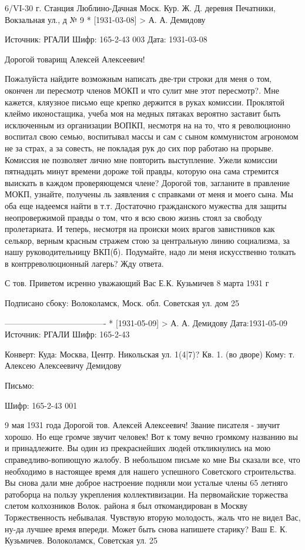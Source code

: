 \documentclass[]{memoir}
\begin{document}
6/VI-30 г.
Станция Люблино-Дачная Моск. Кур. Ж. Д. 
деревня Печатники, Вокзальная ул., д № 9
* [1931-03-08] > А. А. Демидову 

Источник: РГАЛИ
Шифр: 165-2-43 003
Дата: 1931-03-08

Дорогой товарищ
Алексей Алексеевич!

Пожалуйста найдите возможным написать две-три строки для меня о том, окончен ли пересмотр членов МОКП и что сулит мне этот пересмотр?.
Мне кажется, кляузное письмо еще крепко держится в руках комиссии. Проклятой клеймо иконостащика, учеба моя на медных пятаках вероятно заставит быть исключенным из организации ВОПКП, несмотря на на то, что я революционно воспитал свою семью, воспитывал массы и сам с сыном коммунистом агрономом не за страх, а за совесть, не покладая рук до сих пор работаю на прорыве.
Комиссия не позволяет лично мне повторить выступление. Ужели комиссии пятнадцать минут времени дороже той правды, которую она сама стремится выискать в каждом проверяющемся члене?
Дорогой тов, загланите в правление МОКП, узнайте, получены ль заявления с справками от меня и моего сына. Мы оба еще надеемся найти в т.т. Достаточно гражданского мужества для защиты неопровержимой правды о том, что я всю свою жизнь стоял за свободу пролетариата.
И теперь, несмотря на происки моих врагов завистников как селькор, верным красным стражем стою за центральную линию социализма, за нашу руководительницу ВКП(б). Подумайте, надо ли меня искусственно толкать в контрреволюционный лагерь? Жду ответа.

 С тов. Приветом исренно уважающий Вас
Е.К. Кузьмичев
8 марта 1931 г

Подписано сбоку:
Волоколамск, Моск. обл. Советская ул. дом 25


-------------------------------------
* [1931-05-09] > А. А. Демидову 
Дата:1931-05-09
Источник: РГАЛИ
Шифр: 165-2-43

Конверт:
Куда: Москва, Центр.
Никольская ул. 1(4|7)?
Кв. 1. (во дворе)
Кому: т. Алексею Алексеевичу Демидову



Письмо:

Шифр: 165-2-43 001

9 мая 1931 года
Дорогой тов. Алексей Алексеевич!
Звание писателя - звучит хорошо.
Но еще громче звучит человек! Вот к тому вечно громкому названию вы и принадлежите. Вы один из прекраснейших людей откликнулись на мою справедливо-вопиющую жалобу. В небольшом письме ко мне Вы сказали все, что необходимо в настоящее время для нашего успешного Советского строительства. Вы снова дали мне доброе настроение подняли мои усталые члены 65 летняго ратоборца на пользу укрепления коллективизации. На первомайские торжества слетом колхозников Волок. района я был откомандирован в Москву Торжественность небывалая. Чувствую вторую молодость, жаль что не видел Вас, ну-да лучшее время впереди. Может быть снова напишете старику?
Ваш Е. К. Кузьмичев. Волоколамск, Советская ул. 25
\end{document}
